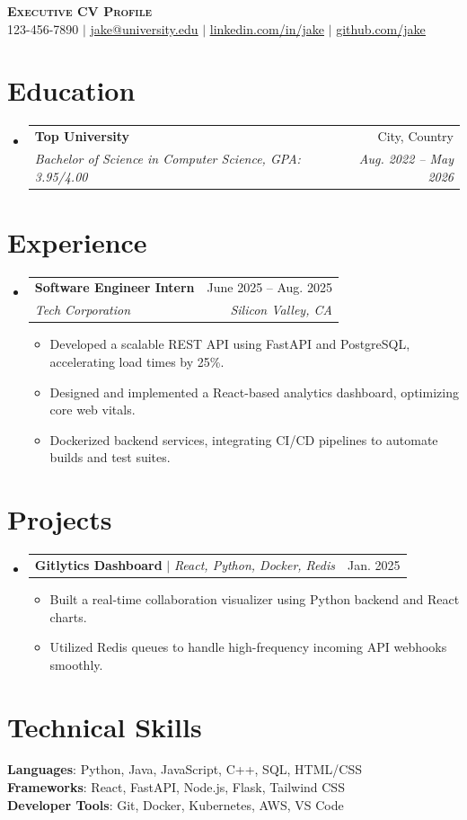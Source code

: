 \documentclass[letterpaper,11pt]{article}
\makeatletter
\newcommand{\resumeItem}[1]{
  \item\small{
    {#1 \vspace{-2pt}}
  }
}
\newcommand{\resumeSubheading}[4]{
  \vspace{-2pt}\item
    \begin{tabular*}{0.97\textwidth}[t]{l@{\extracolsep{\fill}}r}
      \textbf{#1} & #2 \\
      \textit{\small#3} & \textit{\small #4} \\
    \end{tabular*}\vspace{-7pt}
}
\newcommand{\resumeProjectHeading}[2]{
    \item
    \begin{tabular*}{0.97\textwidth}{l@{\extracolsep{\fill}}r}
      \small#1 & #2 \\
    \end{tabular*}\vspace{-7pt}
}
\newcommand{\resumeSubHeadingListStart}{\begin{itemize}[leftmargin=0.15in, label={}]}
\newcommand{\resumeSubHeadingListEnd}{\end{itemize}}
\newcommand{\resumeItemListStart}{\begin{itemize}}
\newcommand{\resumeItemListEnd}{\end{itemize}\vspace{-5pt}}
\makeatother
\begin{document}
\begin{center}
    \textbf{\Huge \scshape Executive CV Profile} \\ \vspace{1pt}
    \small 123-456-7890 $|$ \href{mailto:jake@university.edu}{\underline{jake@university.edu}} $|$ 
    \href{https://linkedin.com}{\underline{linkedin.com/in/jake}} $|$
    \href{https://github.com}{\underline{github.com/jake}}
\end{center}

\section{Education}
  \resumeSubHeadingListStart
    \resumeSubheading
      {Top University}{City, Country}
      {Bachelor of Science in Computer Science, GPA: 3.95/4.00}{Aug. 2022 -- May 2026}
  \resumeSubHeadingListEnd

\section{Experience}
  \resumeSubHeadingListStart
    \resumeSubheading
      {Software Engineer Intern}{June 2025 -- Aug. 2025}
      {Tech Corporation}{Silicon Valley, CA}
      \resumeItemListStart
        \resumeItem{Developed a scalable REST API using FastAPI and PostgreSQL, accelerating load times by 25\%.}
        \resumeItem{Designed and implemented a React-based analytics dashboard, optimizing core web vitals.}
        \resumeItem{Dockerized backend services, integrating CI/CD pipelines to automate builds and test suites.}
      \resumeItemListEnd
  \resumeSubHeadingListEnd

\section{Projects}
  \resumeSubHeadingListStart
    \resumeProjectHeading
      {\textbf{Gitlytics Dashboard} $|$ \emph{React, Python, Docker, Redis}}{Jan. 2025}
      \resumeItemListStart
        \resumeItem{Built a real-time collaboration visualizer using Python backend and React charts.}
        \resumeItem{Utilized Redis queues to handle high-frequency incoming API webhooks smoothly.}
      \resumeItemListEnd
  \resumeSubHeadingListEnd

\section{Technical Skills}
 \begin{itemize}[leftmargin=0.15in, label={}]
    \small{\item{
     \textbf{Languages}{: Python, Java, JavaScript, C++, SQL, HTML/CSS} \\
     \textbf{Frameworks}{: React, FastAPI, Node.js, Flask, Tailwind CSS} \\
     \textbf{Developer Tools}{: Git, Docker, Kubernetes, AWS, VS Code}
    }}
 \end{itemize}
\end{document}
